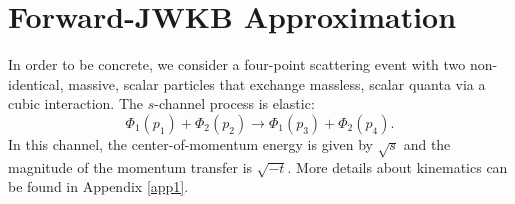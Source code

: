 \section{Forward-JWKB Approximation\label{sec2}}
In order to be concrete, we consider a four-point scattering event with two non-identical, massive, scalar particles that exchange massless, scalar quanta via a cubic interaction. The $s$-channel process is elastic:
\begin{equation}
	\Phi_{1}(p_{1}) + \Phi_{2}(p_{2}) \longrightarrow \Phi_{1}(p_{3}) + \Phi_{2}(p_{4}).
	\label{ScaProc}
\end{equation}
In this channel, the center-of-momentum energy is given by $\sqrt{s}$ and the magnitude of the momentum transfer is $\sqrt{-t}$. More details about kinematics can be found in Appendix \ref{app1}.
